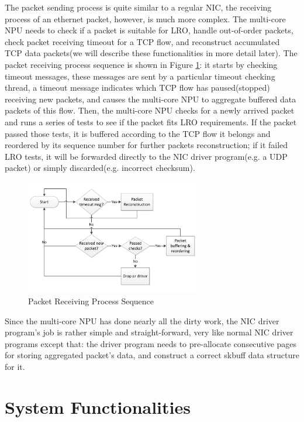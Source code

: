 \documentclass[conference]{IEEEtran}
\begin{document}
The packet sending process is quite similar to a regular NIC, the receiving process of an ethernet packet, however, is much more complex. The multi-core NPU needs to check if a packet is suitable for LRO, handle out-of-order packets, check packet receiving timeout for a TCP flow, and reconstruct accumulated TCP data packets(we will describe these functionalities in more detail later). The packet receiving process sequence is shown in Figure \ref{packet receiving process sequence}: it starts by checking timeout messages, these messages are sent by a particular timeout checking thread, a timeout message indicates which TCP flow has paused(stopped) receiving new packets, and causes the multi-core NPU to aggregate buffered data packets of this flow. Then, the multi-core NPU checks for a newly arrived packet and runs a series of tests to see if the packet fits LRO requirements. If the packet passed those tests, it is buffered according to the TCP flow it belongs and reordered by its sequence number for further packets reconstruction; if it failed LRO tests, it will be forwarded directly to the NIC driver program(e.g. a UDP packet) or simply discarded(e.g. incorrect checksum).
\begin{figure}[!t]
\centering
\includegraphics[width=3.0in]{packet_receiving_process_sequence}
\caption{Packet Receiving Process Sequence}
\label{packet receiving process sequence}
\end{figure}
Since the multi-core NPU has done nearly all the dirty work, the NIC driver program's job is rather simple and straight-forward, very like normal NIC driver programs except that: the driver program needs to pre-allocate consecutive pages for storing aggregated packet's data, and construct a correct skbuff data structure for it.
\section{System Functionalities}
\end{document}
